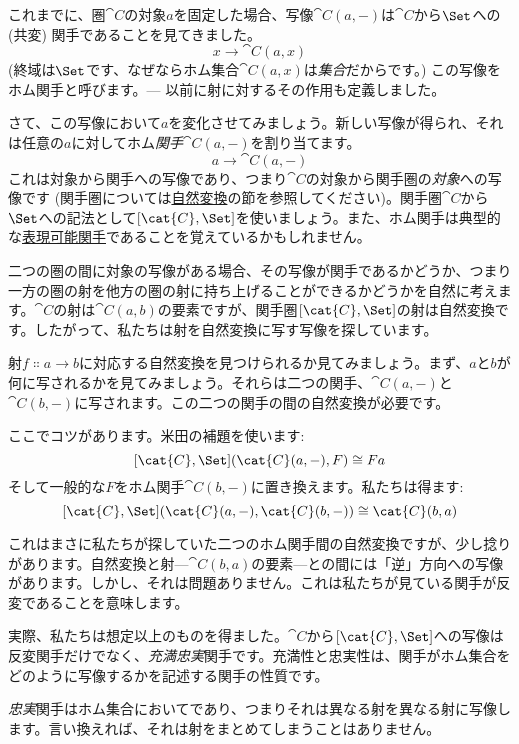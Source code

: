 
\lettrine[lhang=0.17]{こ}{れまで}に、圏$\cat{C}$の対象$a$を固定した場合、写像$\cat{C}(a, -)$は$\cat{C}$から$\Set$への (共変) 関手であることを見てきました。
\[x \to \cat{C}(a, x)\]
 (終域は$\Set$です、なぜならホム集合$\cat{C}(a, x)$は\emph{集合}だからです。) この写像をホム関手と呼びます。--- 以前に射に対するその作用も定義しました。

さて、この写像において$a$を変化させてみましょう。新しい写像が得られ、それは任意の$a$に対してホム\emph{関手}$\cat{C}(a, -)$を割り当てます。
\[a \to \cat{C}(a, -)\]
これは対象から関手への写像であり、つまり$\cat{C}$の対象から関手圏の\emph{対象}への写像です (関手圏については\hyperref[natural-transformations]{自然変換}の節を参照してください)。関手圏$\cat{C}$から$\Set$への記法として$[\cat{C}, \Set]$を使いましょう。また、ホム関手は典型的な\hyperref[representable-functors]{表現可能関手}であることを覚えているかもしれません。

二つの圏の間に対象の写像がある場合、その写像が関手であるかどうか、つまり一方の圏の射を他方の圏の射に持ち上げることができるかどうかを自然に考えます。$\cat{C}$の射は$\cat{C}(a, b)$の要素ですが、関手圏$[\cat{C}, \Set]$の射は自然変換です。したがって、私たちは射を自然変換に写す写像を探しています。

射$f \Colon a \to b$に対応する自然変換を見つけられるか見てみましょう。まず、$a$と$b$が何に写されるかを見てみましょう。それらは二つの関手、$\cat{C}(a, -)$と$\cat{C}(b, -)$に写されます。この二つの関手の間の自然変換が必要です。

ここでコツがあります。米田の補題を使います: 
\[[\cat{C}, \Set](\cat{C}(a, -), F) \cong F a\]
そして一般的な$F$をホム関手$\cat{C}(b, -)$に置き換えます。私たちは得ます: 
\[[\cat{C}, \Set](\cat{C}(a, -), \cat{C}(b, -)) \cong \cat{C}(b, a)\]

\noindent
これはまさに私たちが探していた二つのホム関手間の自然変換ですが、少し捻りがあります。自然変換と射---$\cat{C}(b, a)$の要素---との間には「逆」方向への写像があります。しかし、それは問題ありません。これは私たちが見ている関手が反変であることを意味します。

\noindent
実際、私たちは想定以上のものを得ました。$\cat{C}$から$[\cat{C}, \Set]$への写像は反変関手だけでなく、\emph{充満忠実}関手です。充満性と忠実性は、関手がホム集合をどのように写像するかを記述する関手の性質です。

\emph{忠実}関手はホム集合においてであり、つまりそれは異なる射を異なる射に写像します。言い換えれば、それは射をまとめてしまうことはありません。

